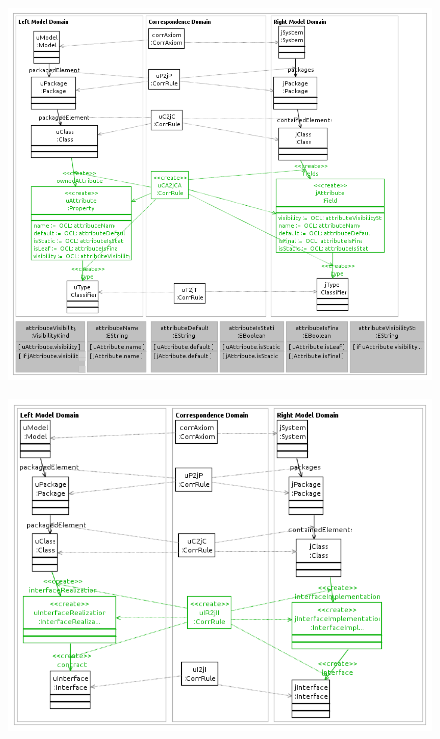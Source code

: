 \documentclass[tuberlin,cic,tc,english,noabntcite]{iiufrgs}
\begin{document}
\begin{figure}[h]
    \caption{}
    \begin{center}
        \includegraphics[width=40em]{uCAttribute2jCAttribute}
    \end{center}
    \label{fig:uCAttribute2jCAttribute}
\end{figure}
\begin{figure}[h]
    \caption{}
    \begin{center}
        \includegraphics[width=40em]{uIRealization2jIImplementation}
    \end{center}
    \label{fig:uIRealization2jIImplementation}
\end{figure}
\end{document}
